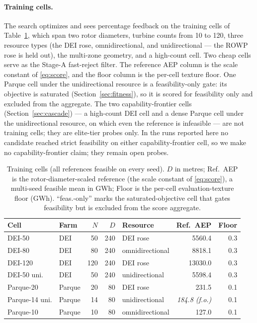 \documentclass[11pt]{article}
\begin{document}
\paragraph{Training cells.} The search optimizes and sees percentage feedback on the
training cells of Table~\ref{tab:cells}, which span two rotor diameters, turbine counts
from 10 to 120, three resource types (the DEI rose, omnidirectional, and unidirectional
--- the ROWP rose is held out), the multi-zone geometry, and a high-count cell. Two
cheap cells serve as the Stage-A fast-reject filter. The reference AEP column is the
scale constant of \cref{eq:score}, and the floor column is the per-cell texture floor.
One Parque cell under the unidirectional resource is a feasibility-only gate: its
objective is saturated (Section~\ref{sec:fitness}), so it is scored for feasibility only
and excluded from the aggregate. The two capability-frontier cells
(Section~\ref{sec:cascade}) --- a high-count DEI cell and a dense Parque cell under the
unidirectional resource, on which even the reference is infeasible --- are not training
cells; they are elite-tier probes only. In the runs reported here no candidate reached
strict feasibility on either capability-frontier cell, so we make no capability-frontier
claim; they remain open probes.

\begin{table}[t]
\centering
\small
\caption{Training cells (all references feasible on every seed). $D$ in metres; Ref.\
AEP is the rotor-diameter-scaled reference (the scale constant of \cref{eq:score}), a
multi-seed feasible mean in GWh; Floor is the per-cell evaluation-texture floor (GWh).
``feas.-only'' marks the saturated-objective cell that gates feasibility but is excluded
from the score aggregate.}
\label{tab:cells}
\begin{tabular}{@{}llrrlrr@{}}
\toprule
Cell & Farm & $N$ & $D$ & Resource & Ref.\ AEP & Floor \\
\midrule
DEI-50            & DEI    & 50  & 240 & DEI rose        & 5560.4  & 0.3 \\
DEI-80            & DEI    & 80  & 240 & omnidirectional & 8818.1  & 0.3 \\
DEI-120           & DEI    & 120 & 240 & DEI rose        & 13030.0 & 0.3 \\
DEI-50 uni.       & DEI    & 50  & 240 & unidirectional  & 5598.4  & 0.3 \\
Parque-20         & Parque & 20  & 80  & DEI rose        & 231.5   & 0.1 \\
Parque-14 uni.    & Parque & 14  & 80  & unidirectional  & \textit{184.8 (f.o.)} & 0.1 \\
Parque-10         & Parque & 10  & 80  & omnidirectional & 127.0   & 0.1 \\
\bottomrule
\end{tabular}
\end{table}
\end{document}
